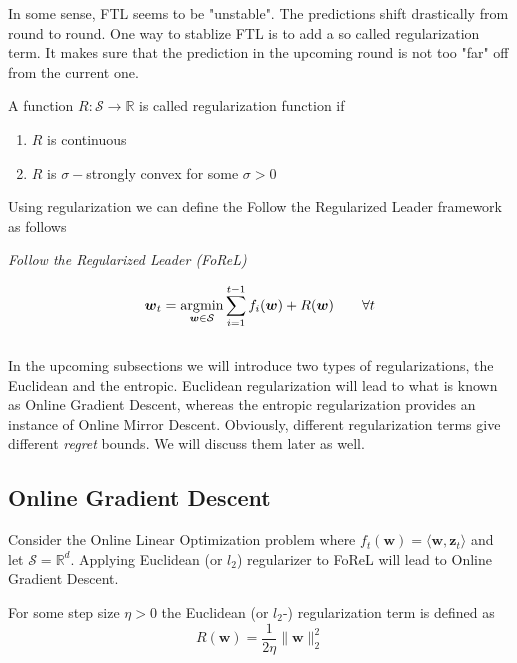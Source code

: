 In some sense, FTL seems to be "unstable". The predictions shift drastically from round to round. One way to stablize FTL is to add a so called regularization term. It makes sure that the prediction in the upcoming round is not too "far" off from the current one. 

\begin{definition}\label{def:regularizer}
    A function $R:\mathcal{S} \to \mathbb{R}$ is called regularization function if
    \begin{enumerate}
    \item $R$ is continuous
    \item $R$ is $\sigma-$strongly convex for some $\sigma > 0$
\end{enumerate}
\end{definition}

Using regularization we can define the Follow the Regularized Leader framework as follows

\begin{center}
    \textit{Follow the Regularized Leader (FoReL)}    
\end{center}
\begin{equation}\label{FoReL}
    \boldsymbol{w}_t = \operatorname*{\arg\!\min}_{\boldsymbol{w} \in \mathcal{S}}\sum_{i=1}^{t-1}f_i(\boldsymbol{w}) + R(\boldsymbol{w}) \qquad \forall t
\end{equation} \\

In the upcoming subsections we will introduce two types of regularizations, the Euclidean and the entropic. Euclidean regularization will lead to what is known as Online Gradient Descent, whereas the entropic regularization provides an instance of Online Mirror Descent. Obviously, different regularization terms give different \textit{regret} bounds. We will discuss them later as well. 


\subsection{Online Gradient Descent}\label{subsection:onlineGradientAscent}

Consider the Online Linear Optimization problem where $f_t(\boldsymbol{w}) = \langle \boldsymbol{w},\boldsymbol{z}_t \rangle$ and let $\mathcal{S} = \mathbb{R}^d$. Applying Euclidean (or $l_2$) regularizer to FoReL will lead to Online Gradient Descent. 

\begin{definition}\label{def:euclideanReg}
    For some step size $\eta > 0$ the Euclidean (or $l_2$-) regularization term is defined as
    \[R(\boldsymbol{w}) = \frac{1}{2\eta}\|\boldsymbol{w}\|_2^2\]
\end{definition}
    

